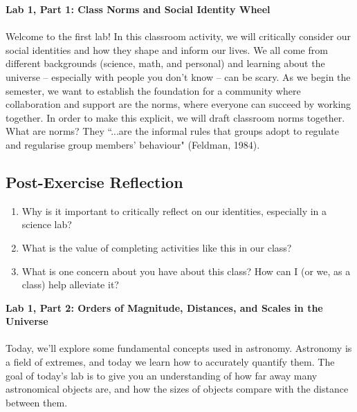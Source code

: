 \documentclass[12pt]{article}
\begin{document}
\begin{flushleft}

\begin{center}
\Large\textbf{Lab 1, Part 1: Class Norms and Social Identity Wheel}
\end{center}

\vspace{20 pt}

\paragraph{}
 
Welcome to the first lab! In this classroom activity, we will critically consider our social identities and how they shape and inform our lives. We all come from different backgrounds (science, math, and personal) and learning about the universe -- especially with people you don't know -- can be scary. As we begin the semester, we want to establish the foundation for a community where collaboration and support are the norms, where everyone can succeed by working together. In order to make this explicit, we will draft classroom norms together. What are norms? They ``...are the informal rules that groups adopt to regulate and regularise group members' behaviour" (Feldman, 1984).

\subsection{Post-Exercise Reflection}

\begin{enumerate}
\item Why is it important to critically reflect on our identities, especially in a science lab? 
\item What is the value of completing activities like this in our class?
\item What is one concern about you have about this class? How can I (or we, as a class) help alleviate it?
\end{enumerate}

\begin{center}
\Large\textbf{Lab 1, Part 2: Orders of Magnitude, Distances, and Scales in the Universe}
\end{center}

\vspace{20 pt}

\paragraph{}
Today, we'll explore some fundamental concepts used in astronomy. Astronomy is a field of extremes, and today we learn how to accurately quantify them. The goal of today's lab is to give you an understanding of how far away many astronomical objects are, and how the sizes of objects compare with the distance between them. 


\end{flushleft}
\end{document}
